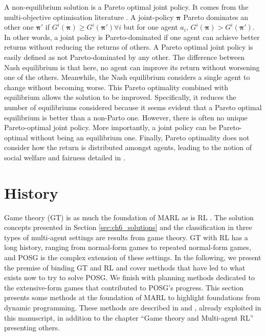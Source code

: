 A non-equilibrium solution is a Pareto optimal joint policy.
It comes from the multi-objective optimisation literature \citep{ehrgott2012vilfredo}.
A joint-policy $\mathbf{\pi}$ Pareto dominates an other one $\mathbf{\pi'}$ if $G^i(\mathbf{\pi}) \ge G^i(\mathbf{\pi'})\forall i$ but for one agent $a_i$, $G^i(\mathbf{\pi}) > G^i(\mathbf{\pi'})$.
In other words, a joint policy is Pareto-dominated if one agent can achieve better returns without reducing the returns of others.
A Pareto optimal joint policy is easily defined as not Pareto-dominated by any other.
The difference between Nash equilibrium is that here, no agent can improve its return without worsening one of the others.
Meanwhile, the Nash equilibrium considers a single agent to change without becoming worse.
This Pareto optimality combined with equilibrium allows the solution to be improved.
Specifically, it reduces the number of equilibriums considered because it seems evident that a Pareto optimal equilibrium is better than a non-Parto one.
However, there is often no unique Pareto-optimal joint policy.
More importantly, a joint policy can be Pareto-optimal without being an equilibrium one.
Finally, Pareto optimality does not consider how the return is distributed amongst agents, leading to the notion of social welfare and fairness detailed in \citep{marl-book}.

\section{History}\label{sec:ch6_history}
Game theory (GT) \citep{von1947theory} is as much the foundation of MARL as is RL \citep{Nowe2012GTMARL, marl-book}.
The solution concepts presented in Section \ref{sec:ch6_solutions} and the classification in three types of multi-agent settings are results from game theory.
GT with RL has a long history, ranging from normal-form games to repeated normal-form games, and POSG is the complex extension of these settings.
In the following, we present the premise of binding GT and RL and cover methods that have led to what exists now to try to solve POSG.
We finish with planning methods dedicated to the extensive-form games that contributed to POSG's progress.
This section presents some methods at the foundation of MARL to highlight foundations from dynamic programming.
These methods are described in \citep{marl-book} and \citep{russel2010}, already exploited in this manuscript, in addition to the chapter ``Game theory and Multi-agent RL'' \citep{Nowe2012GTMARL} presenting others.

